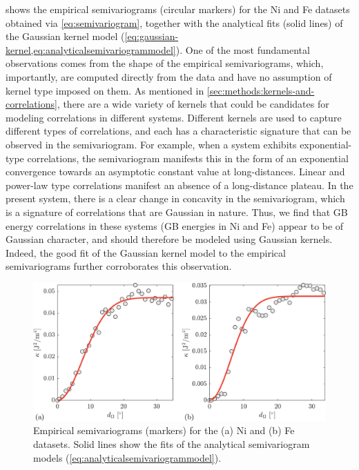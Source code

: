 \documentclass[final,twocolumn,12pt]{elsarticle}
\begin{document}
     shows the empirical semivariograms (circular markers) for the Ni and Fe datasets obtained via \cref{eq:semivariogram}, together with the analytical fits (solid lines) of the Gaussian kernel model (\cref{eq:gaussian-kernel,eq:analyticalsemivariogrammodel}). One of the most fundamental observations comes from the shape of the empirical semivariograms, which, importantly, are computed directly from the data and have no assumption of kernel type imposed on them. As mentioned in \cref{sec:methods:kernels-and-correlations}, there are a wide variety of kernels that could be candidates for modeling correlations in different systems. Different kernels are used to capture different types of correlations, and each has a characteristic signature that can be observed in the semivariogram. For example, when a system exhibits exponential-type correlations, the semivariogram manifests this in the form of an exponential convergence towards an asymptotic constant value at long-distances. Linear and power-law type correlations manifest an absence of a long-distance plateau. In the present system, there is a clear change in concavity in the semivariogram, which is a signature of correlations that are Gaussian in nature. Thus, we find that GB energy correlations in these systems (GB energies in Ni and Fe) appear to be of Gaussian character, and should therefore be modeled using Gaussian kernels. Indeed, the good fit of the Gaussian kernel model to the empirical semivariograms further corroborates this observation.
	\begin{figure}
	    \centering
	    \includegraphics[scale=0.75]{figures/GlobalCorrelationLengthVariograms.png}
	    \caption{Empirical semivariograms (markers) for the (a) Ni and (b) Fe datasets. Solid lines show the fits of the analytical semivariogram models (\cref{eq:analyticalsemivariogrammodel}).}
	    \label{fig:globalvariogramfits}
	\end{figure}
    
\end{document}
